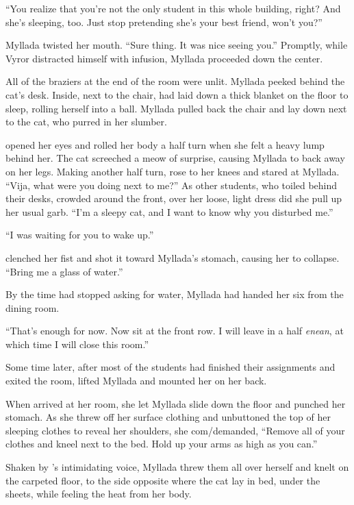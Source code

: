 ``You realize that you're not the only student in this whole building, right? And she's sleeping, too. Just stop pretending she's your best friend, won't you?''

Myllada twisted her mouth. ``Sure thing. It was nice seeing you.'' Promptly, while Vyror distracted himself with infusion, Myllada proceeded down the center.

All of the braziers at the end of the room were unlit. Myllada peeked behind the cat's desk. Inside, next to the chair, \yronsyncra{} had laid down a thick blanket on the floor to sleep, rolling herself into a ball. Myllada pulled back the chair and lay down next to the cat, who purred in her slumber.

\centeredstars

\yronsyncra{} opened her eyes and rolled her body a half turn when she felt a heavy lump behind her. The cat screeched a meow of surprise, causing Myllada to back away on her legs. Making another half turn, \yronsyncra{} rose to her knees and stared at Myllada. ``Vija, what were you doing next to me?'' As other students, who toiled behind their desks, crowded around the front, over her loose, light dress did she pull up her usual garb. ``I'm a sleepy cat, and I want to know why you disturbed me.''

``I was waiting for you to wake up.''

\yronsyncra{} clenched her fist and shot it toward Myllada's stomach, causing her to collapse. ``Bring me a glass of water.''

\centeredstars

By the time \yronsyncra{} had stopped asking for water, Myllada had handed her six from the dining room.

``That's enough for now. Now sit at the front row. I will leave in a half \emph{enean}, at which time I will close this room.''

Some time later, after most of the students had finished their assignments and exited the room, \yronsyncra{} lifted Myllada and mounted her on her back.

\centeredstars

When \yronsyncra{} arrived at her room, she let Myllada slide down the floor and punched her stomach. As she threw off her surface clothing and unbuttoned the top of her sleeping clothes to reveal her shoulders, she com/demanded, ``Remove all of your clothes and kneel next to the bed. Hold up your arms as high as you can.''

Shaken by \yronsyncra's intimidating voice, Myllada threw them all over herself and knelt on the carpeted floor, to the side opposite where the cat lay in bed, under the sheets, while feeling the heat from her body.

